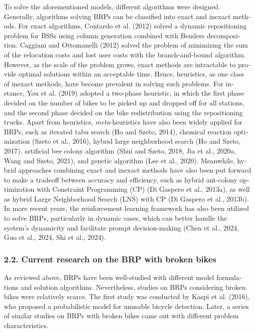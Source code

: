\documentclass[
  english,
]{article}
\begin{document}
\begin{otherlanguage}{english}
\protect{}\label{p0110}
To solve the aforementioned models, different algorithms were designed. Generally, algorithms
solving BRPs can be classified into exact and inexact methods. For exact algorithms, Contardo et al.
(2012) solved a dynamic repositioning problem for BSSs using column generation combined with Benders
decomposition. Caggiani and Ottomanelli (2012) solved the problem of minimizing the sum of the
relocation costs and lost user costs with the branch-and-bound algorithm. However, as the scale of
the problem grows, exact methods are intractable to provide optimal solutions within an acceptable
time. Hence, heuristics, as one class of inexact methods, have become prevalent in solving such
problems. For instance, You et al. (2019) adopted a two-phase heuristic, in which the first phase
decided on the number of bikes to be picked up and dropped off for all stations, and the second
phase decided on the bike redistribution using the repositioning trucks. Apart from heuristics,
\emph{meta}-heuristics have also been widely applied for BRPs, such as iterated tabu search (Ho and
Szeto, 2014), chemical reaction optimization (Szeto et al., 2016), hybrid large neighborhood search
(Ho and Szeto, 2017), artificial bee colony algorithm (Shui and Szeto, 2018, Jia et al., 2020a, Wang
and Szeto, 2021), and genetic algorithm (Lee et al., 2020). Meanwhile, hybrid approaches combining
exact and inexact methods have also been put forward to make a tradeoff between accuracy and
efficiency, such as hybrid ant-colony optimization with Constraint Programming (CP) (Di Gaspero et
al., 2013a), as well as hybrid Large Neighborhood Search (LNS) with CP (Di Gaspero et al., 2013b).
In more recent years, the reinforcement learning framework has also been utilized to solve BRPs,
particularly in dynamic cases, which can better handle the system's dynamicity and facilitate prompt
decision-making (Chen et al., 2024, Guo et al., 2024, Shi et al., 2024).

\protect{}\label{s0020}
\subsubsection{2.2. Current research on the BRP with broken bikes}\label{st040}

\protect{}\label{p0115}
As reviewed above, BRPs have been well-studied with different model formulations and solution
algorithms. Nevertheless, studies on BRPs considering broken bikes were relatively scarce. The first
study was conducted by Kaspi et al. (2016), who proposed a probabilistic model for unusable bicycle
detection. Later, a series of similar studies on BRPs with broken bikes came out with different
problem characteristics.


\end{otherlanguage}
\end{document}
